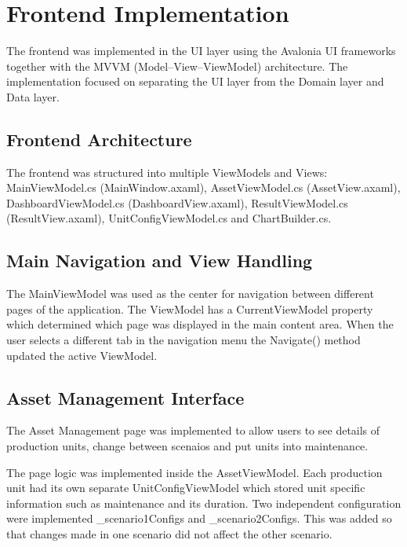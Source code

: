 

\section{Frontend Implementation}

The frontend was implemented in the UI layer using the Avalonia UI frameworks together with the MVVM (Model--View--ViewModel) architecture.  
The implementation focused on separating the UI layer from the Domain layer and Data layer.

\subsection{Frontend Architecture}

The frontend was structured into multiple ViewModels and Views: MainViewModel.cs (MainWindow.axaml), AssetViewModel.cs (AssetView.axaml), DashboardViewModel.cs (DashboardView.axaml), ResultViewModel.cs (ResultView.axaml), UnitConfigViewModel.cs and ChartBuilder.cs.



\subsection{Main Navigation and View Handling}

The MainViewModel was used as the center for navigation between different pages of the application. 
The ViewModel has a CurrentViewModel property which determined which page was displayed in the main content area. When the user selects a different tab in the navigation menu the Navigate() method updated the active ViewModel.


\subsection{Asset Management Interface}


The Asset Management page was implemented to allow users to see details of production units, change between scenaios and put units into maintenance.

The page logic was implemented inside the AssetViewModel.  
Each production unit had its own separate UnitConfigViewModel which stored unit specific information such as maintenance and its duration.
Two independent configuration were implemented \_scenario1Configs and \_scenario2Configs.
This was added so that changes made in one scenario did not affect the other scenario.  

